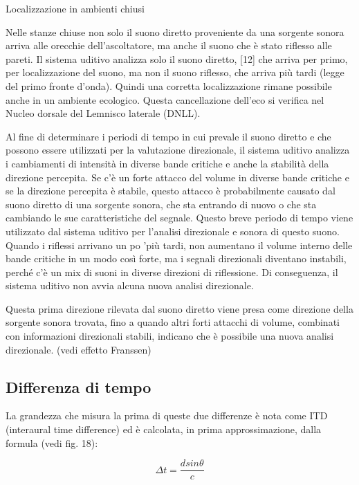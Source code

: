 Localizzazione in ambienti chiusi

Nelle stanze chiuse non solo il suono diretto proveniente da una sorgente sonora
arriva alle orecchie dell'ascoltatore, ma anche il suono che è stato riflesso
alle pareti. Il sistema uditivo analizza solo il suono diretto, [12] che arriva
per primo, per localizzazione del suono, ma non il suono riflesso, che arriva più
tardi (legge del primo fronte d'onda). Quindi una corretta localizzazione rimane
possibile anche in un ambiente ecologico. Questa cancellazione dell'eco si verifica
nel Nucleo dorsale del Lemnisco laterale (DNLL).

Al fine di determinare i periodi di tempo in cui prevale il suono diretto e che
possono essere utilizzati per la valutazione direzionale, il sistema uditivo
analizza i cambiamenti di intensità in diverse bande critiche e anche la stabilità
della direzione percepita. Se c'è un forte attacco del volume in diverse bande
critiche e se la direzione percepita è stabile, questo attacco è probabilmente
causato dal suono diretto di una sorgente sonora, che sta entrando di nuovo o
che sta cambiando le sue caratteristiche del segnale. Questo breve periodo di
tempo viene utilizzato dal sistema uditivo per l'analisi direzionale e sonora
di questo suono. Quando i riflessi arrivano un po 'più tardi, non aumentano il
volume interno delle bande critiche in un modo così forte, ma i segnali
direzionali diventano instabili, perché c'è un mix di suoni in diverse direzioni
di riflessione. Di conseguenza, il sistema uditivo non avvia alcuna nuova analisi
direzionale.

Questa prima direzione rilevata dal suono diretto viene presa come direzione
della sorgente sonora trovata, fino a quando altri forti attacchi di volume,
combinati con informazioni direzionali stabili, indicano che è possibile una nuova
analisi direzionale. (vedi effetto Franssen)

\subsection{Differenza di tempo}

La grandezza che misura la prima di queste due differenze è nota come
ITD (interaural time difference) ed è calcolata, in prima approssimazione,
dalla formula (vedi fig. 18):

\begin{equation}
\Delta t = \frac{d sin\theta}{c}
\end{equation}

